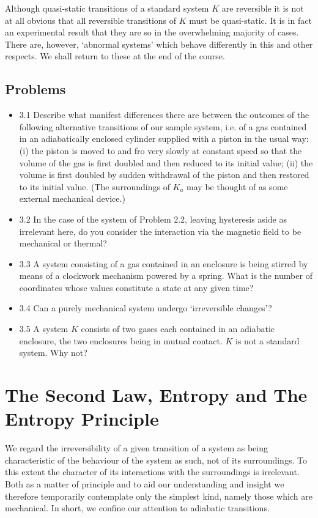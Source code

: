 \documentclass{article}
\theoremstyle{definition}
\begin{document}
Although quasi-static transitions of a standard system \( K \) are reversible it is not at all obvious that all reversible transitions of \( K \) must be quasi-static. It is in fact an experimental result that they are so in the overwhelming majority of cases. There are, however, ‘abnormal systems’ which behave differently in this and other respects. We shall return to these at the end of the course.

\subsection{Problems}
\begin{itemize}
\item 3.1 Describe what manifest differences there are between the outcomes of the following alternative transitions of our sample system, i.e. of a gas contained in an adiabatically enclosed cylinder supplied with a piston in the usual way: (i) the piston is moved to and fro very slowly at constant speed so that the volume of the gas is first doubled and then reduced to its initial value; (ii) the volume is first doubled by sudden withdrawal of the piston and then restored to its initial value. (The surroundings of \( K_a \) may be thought of as some external mechanical device.)
\item 3.2 In the case of the system of Problem 2.2, leaving hysteresis aside as irrelevant here, do you consider the interaction via the magnetic field to be mechanical or thermal?
\item 3.3 A system consisting of a gas contained in an enclosure is being stirred by means of a clockwork mechanism powered by a spring. What is the number of coordinates whose values constitute a state at any given time?
\item 3.4 Can a purely mechanical system undergo ‘irreversible changes’?
\item 3.5 A system \( K \) consists of two gases each contained in an adiabatic enclosure, the two enclosures being in mutual contact. \( K \) is not a standard system. Why not?
\end{itemize}



\section{The Second Law, Entropy and The Entropy Principle}

We regard the irreversibility of a given transition of a system as being characteristic of the behaviour of the system as such, not of its surroundings. To this extent the character of its interactions with the surroundings is irrelevant. Both as a matter of principle and to aid our understanding and insight we therefore temporarily contemplate only the simplest kind, namely those which are mechanical. In short, we confine our attention to adiabatic transitions.
\end{document}

